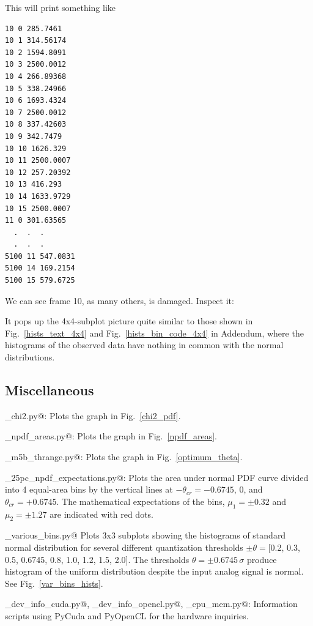 \documentclass[letterpaper,twoside,12pt]{article}
\begin{document}
This will print something like
\begin{verbatim}
10 0 285.7461
10 1 314.56174
10 2 1594.8091
10 3 2500.0012
10 4 266.89368
10 5 338.24966
10 6 1693.4324
10 7 2500.0012
10 8 337.42603
10 9 342.7479
10 10 1626.329
10 11 2500.0007
10 12 257.20392
10 13 416.293
10 14 1633.9729
10 15 2500.0007
11 0 301.63565
  .  .  .  
  .  .  .  
5100 11 547.0831
5100 14 169.2154
5100 15 579.6725
\end{verbatim}

We can see frame 10, as many others, is damaged. Inspect it: \\

\noindent \verb@%run inspect_nt.py rd1910_wz_268-1811_text.m5b 056  10 1@ \\

It pops up the 4x4-subplot picture quite similar to those shown in Fig.~\ref{hists_text_4x4} and Fig.~\ref{hists_bin_code_4x4} in Addendum, where the histograms of the observed data have nothing in common with the normal distributions. 



\subsection{Miscellaneous}

\noindent \verb@plot_chi2.py@: Plots the graph in Fig.~\ref{chi2_pdf}. \par
\noindent \verb@plot_npdf_areas.py@: Plots the graph in Fig.~\ref{npdf_areas}. \par
\noindent \verb@plot_m5b_thrange.py@: Plots the graph in Fig.~\ref{optimum_theta}. \par

\hangindent=1cm 
\noindent \verb@plot_25pc_npdf_expectations.py@: Plots the area under normal PDF curve divided into 4 
equal-area bins by the vertical lines at $-\theta_{cr} = -0.6745$, 0, and $\theta_{cr} = +0.6745$. The mathematical expectations of the bins, $\mu_1=\pm 0.32$ and $\mu_2=\pm 1.27$ are indicated with red dots. \par
\hangindent=1cm 
\noindent \verb@plot_various_bins.py@ Plots 3x3 subplots showing the histograms of standard normal distribution for several different quantization thresholds $\pm\theta = $[0.2, 0.3, 0.5, 0.6745, 0.8, 1.0, 1.2, 1.5, 2.0]. The thresholds $\theta = \pm 0.6745 \, \sigma$ produce histogram of the uniform distribution despite the input analog signal is normal. See Fig.~\ref{var_bins_hists}. \par
\hangindent=1cm 
\noindent \verb@get_dev_info_cuda.py@, \verb@get_dev_info_opencl.py@, \verb@get_cpu_mem.py@: Information scripts using PyCuda and PyOpenCL for the hardware inquiries. 
\end{document}
